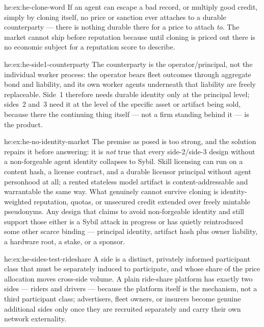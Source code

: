 \begin{pdSolution}{he:ex:he-clone-word}
If an agent can escape a bad record, or multiply good credit, simply by cloning
itself, no price or sanction ever attaches to a durable counterparty --- there is
nothing durable there for a price to attach \emph{to}. The market cannot ship
before reputation because until cloning is priced out there is no economic
subject for a reputation score to describe.
\end{pdSolution}
\begin{pdSolution}{he:ex:he-side1-counterparty}
The counterparty is the operator/principal, not the individual worker
process: the operator bears fleet outcomes through aggregate bond and liability,
and its own worker agents underneath that liability are freely replaceable.
Side~1 therefore needs durable identity only at the principal level; sides~2 and~3
need it at the level of the specific asset or artifact being sold, because there
the continuing thing itself --- not a firm standing behind it --- is the product.
\end{pdSolution}
\begin{pdSolution}{he:ex:he-no-identity-market}
The premise as posed is too strong, and the solution repairs it before
answering: it is \emph{not} true that every side-2/side-3 design without a
non-forgeable agent identity collapses to Sybil. Skill licensing can run on a
content hash, a license contract, and a durable licensor principal without agent
personhood at all; a rented stateless model artifact is content-addressable and
warrantable the same way. What genuinely cannot survive cloning is
identity-weighted reputation, quotas, or unsecured credit extended over freely
mintable pseudonyms. Any design that claims to avoid non-forgeable identity and
still support those either is a Sybil attack in progress or has quietly
reintroduced some other scarce binding --- principal identity, artifact hash plus
owner liability, a hardware root, a stake, or a sponsor.
\end{pdSolution}
\begin{pdSolution}{he:ex:he-sides-test-rideshare}
A side is a distinct, privately informed participant class that must be
separately induced to participate, and whose share of the price allocation moves
cross-side volume. A plain ride-share platform has exactly two sides --- riders
and drivers --- because the platform itself is the mechanism, not a third
participant class; advertisers, fleet owners, or insurers become genuine
additional sides only once they are recruited separately and carry their own
network externality.
\end{pdSolution}

